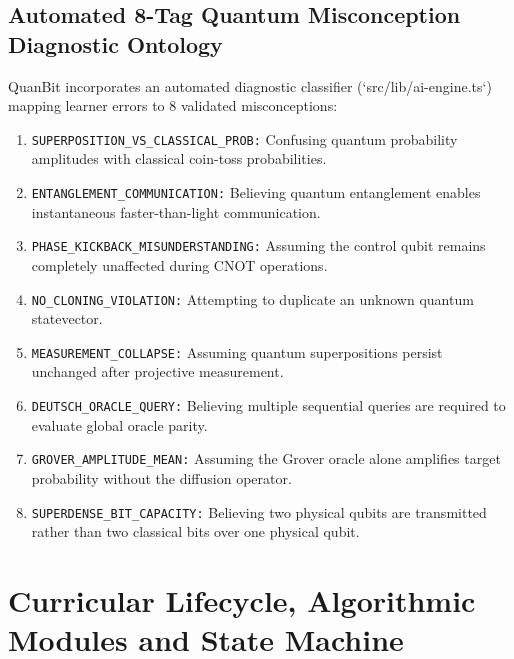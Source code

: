 \documentclass[11pt, a4paper]{article}
\begin{document}
\subsection{Automated 8-Tag Quantum Misconception Diagnostic Ontology}
QuanBit incorporates an automated diagnostic classifier (`src/lib/ai-engine.ts`) mapping learner errors to 8 validated misconceptions:
\begin{enumerate}[label=\textbf{\arabic*.}]
	\item \texttt{SUPERPOSITION\_VS\_CLASSICAL\_PROB:} Confusing quantum probability amplitudes with classical coin-toss probabilities.
	\item \texttt{ENTANGLEMENT\_COMMUNICATION:} Believing quantum entanglement enables instantaneous faster-than-light communication.
	\item \texttt{PHASE\_KICKBACK\_MISUNDERSTANDING:} Assuming the control qubit remains completely unaffected during CNOT operations.
	\item \texttt{NO\_CLONING\_VIOLATION:} Attempting to duplicate an unknown quantum statevector.
	\item \texttt{MEASUREMENT\_COLLAPSE:} Assuming quantum superpositions persist unchanged after projective measurement.
	\item \texttt{DEUTSCH\_ORACLE\_QUERY:} Believing multiple sequential queries are required to evaluate global oracle parity.
	\item \texttt{GROVER\_AMPLITUDE\_MEAN:} Assuming the Grover oracle alone amplifies target probability without the diffusion operator.
	\item \texttt{SUPERDENSE\_BIT\_CAPACITY:} Believing two physical qubits are transmitted rather than two classical bits over one physical qubit.
\end{enumerate}

\newpage

\section{Curricular Lifecycle, Algorithmic Modules and State Machine}
\end{document}

